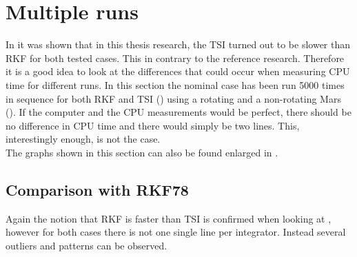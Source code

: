 \section{Multiple runs}
\label{sec:multipleRuns}
In  it was shown that in this thesis research, the \ac{TSI} turned out to be slower than \ac{RKF} for both tested cases. This in contrary to the reference research. Therefore it is a good idea to look at the differences that could occur when measuring CPU time for different runs. In this section the nominal case has been run 5000 times in sequence for both \ac{RKF} and \ac{TSI} () using a rotating and a non-rotating Mars (). If the computer and the CPU measurements would be perfect, there should be no difference in CPU time and there would simply be two lines. This, interestingly enough, is not the case.\\

\noindent
The graphs shown in this section can also be found enlarged in .

\subsection{Comparison with \ac{RKF78}}
\label{subsec:timeCompRKF}
Again the notion that \ac{RKF} is faster than \ac{TSI} is confirmed when looking at , however for both cases there is not one single line per integrator. Instead several outliers and patterns can be observed. 

%
%
%

